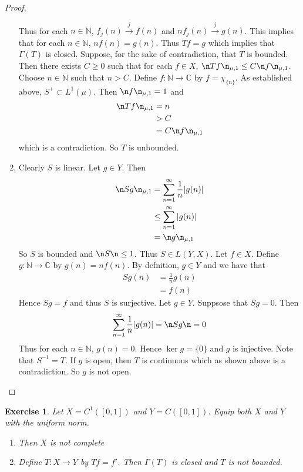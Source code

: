 \documentclass[12pt]{amsart}
\newtheorem{ex}[thm]{Exercise}
\newcommand{\Gam}{\Gamma}
\newcommand{\C}{\mathbb{C}}
\newcommand{\N}{\mathbb{N}}
\newcommand{\conv}[1]{\xrightarrow{#1}}
\begin{document}
\begin{proof}
\begin{enumerate}
		Thus for each $n \in \N$, $f_j(n) \conv{j} f(n)$ and $nf_j(n) \conv{j} g(n)$. This implies that for each $n \in \N$, $nf(n) = g(n)$. Thus $Tf = g$ which implies that $\Gam(T)$ is closed. Suppose, for the sake of contradiction, that $T$ is bounded. Then there exists $C \geq 0$ such that for each $f \in X$, $\n Tf \n_{\mu,1} \leq C \n f \n_{\mu, 1}$. Choose $n \in \N$ such that $n > C$. Define $f: \N \rightarrow \C$ by $f = \chi_{\{n\}}$. As established above, $S^+ \subset L^1(\mu)$. Then $\n f \n_{\mu,1} = 1$ and
		\begin{align*}
			\n Tf \n_{\mu,1}
			& = n \\
			&> C\\
			& = C \n f \n_{\mu,1}
		\end{align*}
		which is a contradiction. So $T$ is unbounded.
		\item Clearly $S$ is linear. Let $g \in Y$. Then \begin{align*}
			\n Sg \n_{\mu,1} 
			&= \sum_{n =1}^{\infty} \frac{1}{n} \vert g(n) \vert \\
			& \leq  \sum_{n =1}^{\infty} \vert g(n) \vert \\
			& = \n g \n_{\mu,1}
		\end{align*}
		So $S$ is bounded and $\n S \n \leq 1$. Thus $S \in L(Y,X)$. Let $f \in X$. Define $g: \N \rightarrow \C$ by $g(n) = nf(n)$. By defnition, $g \in Y$ and we have that
		\begin{align*}
			Sg(n) 
			&= \frac{1}{n}g(n) \\
			& = f(n)
		\end{align*}
		Hence $Sg =f$ and thus $S$ is surjective. Let $g \in Y$. Suppsose that $Sg = 0$. Then $$\sum_{n=1}^{\infty} \frac{1}{n}\vert g(n)\vert =\n Sg \n  = 0$$ Thus for each $n \in \N$, $g(n) = 0$. Hence $\ker g = \{0\}$ and $g$ is injective. Note that $S^{-1} = T$. If $g$ is open, then $T$ is continuous which as shown above is a contradiction. So $g$ is not open. 
	\end{enumerate}
\end{proof}

\begin{ex}
	Let $X = C^1([0,1])$ and $Y=C([0,1])$. Equip both $X$ and $Y$ with the uniform norm. 
	\begin{enumerate}
		\item Then $X$ is not complete
		\item Define $T: X \rightarrow Y$ by $Tf = f'$. Then $\Gam(T)$ is closed and $T$ is not bounded. 
	\end{enumerate}
\end{ex}
\end{document}
